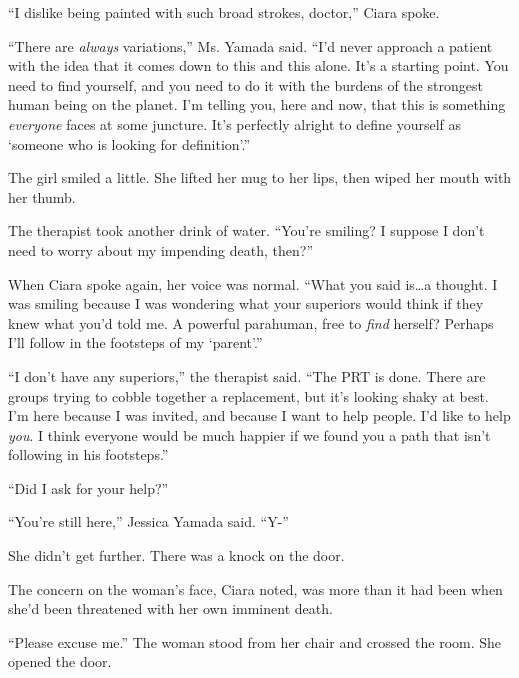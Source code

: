 ``I dislike being painted with such broad strokes, doctor,'' Ciara spoke.



``There are \emph{always }variations,'' Ms. Yamada said.  ``I'd never approach a patient with the idea that it comes down to this and this alone.  It's a starting point.  You need to find yourself, and you need to do it with the burdens of the strongest human being on the planet.  I'm telling you, here and now, that this is something \emph{everyone} faces at some juncture.  It's perfectly alright to define yourself as `someone who is looking for definition'.''



The girl smiled a little.  She lifted her mug to her lips, then wiped her mouth with her thumb.



The therapist took another drink of water.  ``You're smiling?  I suppose I don't need to worry about my impending death, then?''



When Ciara spoke again, her voice was normal.  ``What you said is\ldots a thought.  I was smiling because I was wondering what your superiors would think if they knew what you'd told me.  A powerful parahuman, free to \emph{find} herself?  Perhaps I'll follow in the footsteps of my `parent'.''



``I don't have any superiors,'' the therapist said.  ``The PRT is done.  There are groups trying to cobble together a replacement, but it's looking shaky at best.  I'm here because I was invited, and because I want to help people.  I'd like to help \emph{you}.  I think everyone would be much happier if we found you a path that isn't following in his footsteps.''



``Did I ask for your help?''



``You're still here,'' Jessica Yamada said.  ``Y-''



She didn't get further.  There was a knock on the door.



The concern on the woman's face, Ciara noted, was more than it had been when she'd been threatened with her own imminent death.



``Please excuse me.''  The woman stood from her chair and crossed the room.  She opened the door.



